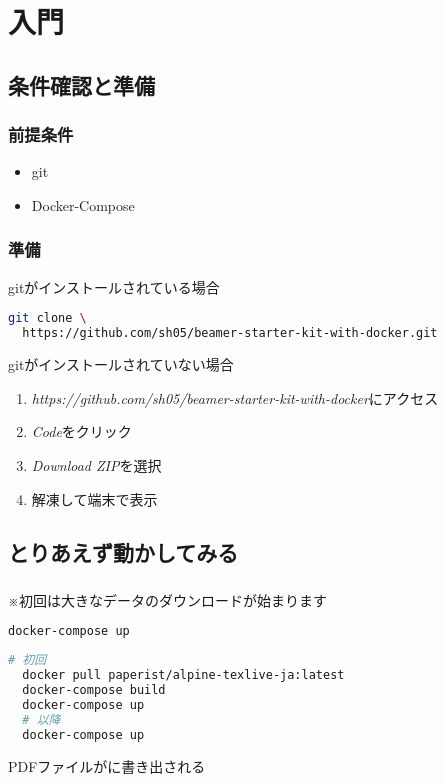 \section{入門}
\subsection{条件確認と準備}
\begin{frame}{}
  \frametitle{前提条件}
  \begin{itemize}
    \item git
    \item Docker-Compose
  \end{itemize}
\end{frame}

\begin{frame}[fragile]
  \frametitle{準備}
  gitがインストールされている場合
  \scriptsize
  \begin{lstlisting}[language=sh]
  git clone \
  https://github.com/sh05/beamer-starter-kit-with-docker.git
  \end{lstlisting}
  \normalsize
  \medskip
  gitがインストールされていない場合
  \begin{enumerate}
      \item \footnotesize{\textit{https://github.com/sh05/beamer-starter-kit-with-docker}}にアクセス
      \item \textit{Code}をクリック
      \item \textit{Download ZIP}を選択
      \item 解凍して端末で表示
  \end{enumerate}
\end{frame}

\subsection{とりあえず動かしてみる}
\begin{frame}[fragile]
  \frametitle{\insertsubsection}
  ※初回は大きなデータのダウンロードが始まります
  \scriptsize
  \begin{lstlisting}[caption=雑な実行, language=sh]
  docker-compose up
  \end{lstlisting}
  \begin{lstlisting}[caption=丁寧な実行, language=sh]
  # 初回
  docker pull paperist/alpine-texlive-ja:latest
  docker-compose build
  docker-compose up
  # 以降
  docker-compose up
  \end{lstlisting}
  \normalsize
    PDFファイルがに書き出される
\end{frame}

